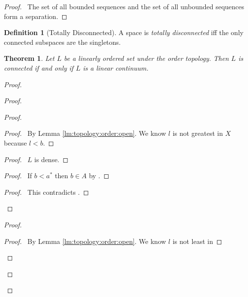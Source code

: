 \documentclass{report}
\let\qed\relax
\newtheorem{thm}[lm]{Theorem}
\theoremstyle{definition}
\newtheorem{df}[lm]{Definition}
\begin{document}
  \begin{proof}
    \pf\ The set of all bounded sequences and the set of all unbounded
    sequences
    form a separation. \qed
  \end{proof}

  \begin{df}[Totally Disconnected]
    A space is \emph{totally disconnected} iff the only connected subspaces are
    the singletons.
  \end{df}

  \begin{thm}
    Let $L$ be a linearly ordered set under the order topology. Then $L$ is
connected if and only if $L$ is a linear continuum.
  \end{thm}

  \begin{proof}
    \pf
    \begin{proof}
    \begin{proof}
      \step{<3>1}{\pick\ $a' > l$ such that $[l, a') \subseteq A$}
      \begin{proof}
        \pf\ By Lemma \ref{lm:topology:order:open}. We know $l$ is not greatest
        in $X$ because $l < b$.
      \end{proof}
      \begin{proof}
        \pf\ $L$ is dense.
      \end{proof}
      \begin{proof}
        \pf\ If $b < a^*$ then $b \in A$ by .
      \end{proof}
      \qedstep
      \begin{proof}
        \pf\ This contradicts .
      \end{proof}
    \end{proof}
    \begin{proof}
      \step{<3>1}{\pick\ $b' < l$ such that $(b', l] \subseteq B$}
      \begin{proof}
        \pf\ By Lemma \ref{lm:topology:order:open}. We know $l$ is not least in

\end{proof}
\end{proof}
\end{proof}
\end{proof}
\end{document}
